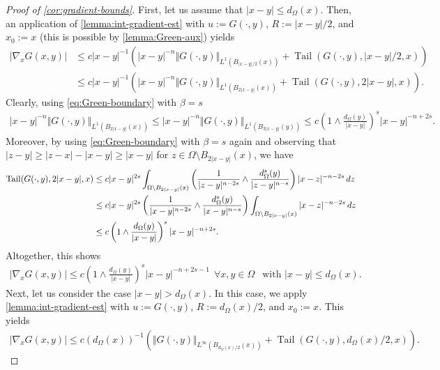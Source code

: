 \documentclass[11pt,reqno]{amsart}
\theoremstyle{plain}
\theoremstyle{definition}
\numberwithin{equation}{section}
\newcommand{\1}{\mathbbm{1}}
\DeclareMathOperator{\tail}{Tail}
\renewcommand{\d}{\textnormal{\,d}}
\begin{document}
\begin{proof}[Proof of \autoref{cor:gradient-bounds}]
First, let us assume that $|x-y| \le d_{\Omega}(x)$. Then, an application of \autoref{lemma:int-gradient-est} with $u := G(\cdot,y)$, $R := |x-y|/2$, and $x_0 := x$ (this is possible by \autoref{lemma:Green-aux}) yields
\begin{align*}
|\nabla_x G(x,y)|
&\le c |x-y|^{-1} \left( |x-y|^{-n} \Vert G(\cdot,y) \Vert_{L^{1}(B_{|x-y|/2}(x))} + \tail(G(\cdot,y),|x-y|/2, x) \right) \\
&\le c |x-y|^{-1} \left( |x-y|^{-n} \Vert G(\cdot,y) \Vert_{L^{1}(B_{2|x-y|}(x))} + \tail(G(\cdot,y),2|x-y|, x) \right).
\end{align*}
Clearly, using \eqref{eq:Green-boundary} with $\beta=s$
\begin{align*}
|x-y|^{-n} \Vert G(\cdot,y) \Vert_{L^{1}(B_{2|x-y|}(x))} \le |x-y|^{-n} \Vert G(\cdot,y) \Vert_{L^{1}(B_{3|x-y|}(y))} \le c \left( 1 \wedge \frac{d_{\Omega}(y)}{|x-y|} \right)^s |x-y|^{-n+2s}.
\end{align*}
Moreover, by using \eqref{eq:Green-boundary} with $\beta=s$ again and observing that $|z-y| \ge |z-x| - |x-y| \ge |x-y|$ for $z \in \Omega \setminus B_{2|x-y|}(x)$, we have
\begin{align*}
    \tail(G(\cdot,y),2|x-y|,x)
    &\le c |x-y|^{2s} \int_{\Omega \setminus B_{2|x-y|}(x)} \left( \frac{1}{|z-y|^{n-2s}} \wedge \frac{d_\Omega^s(y)}{|z-y|^{n-s}} \right) |x-z|^{-n-2s} \d z \\
    &\leq c |x-y|^{2s} \left( \frac{1}{|x-y|^{n-2s}} \wedge \frac{d_\Omega^s(y)}{|x-y|^{n-s}} \right) \int_{\Omega \setminus B_{2|x-y|}(x)} |x-z|^{-n-2s} \d z \\
    &\leq c\left( 1 \wedge \frac{d_\Omega(y)}{|x-y|} \right)^s |x-y|^{-n+2s}.
\end{align*}
Altogether, this shows
\begin{align*}
|\nabla_x G(x,y)| \le c \left( 1 \wedge \frac{d_{\Omega}(y)}{|x-y|} \right)^s |x-y|^{-n+2s-1} ~~ \forall x,y \in \Omega ~~ \text{ with } |x-y| \le d_{\Omega}(x).
\end{align*}
Next, let us consider the case $|x-y|>d_{\Omega}(x)$. In this case, we apply \autoref{lemma:int-gradient-est} with $u := G(\cdot,y)$, $R := d_{\Omega}(x)/2$, and $x_0 := x$. This yields
\begin{align*}
|\nabla_x G(x,y)| \le c (d_{\Omega}(x))^{-1} \left( \Vert G(\cdot,y) \Vert_{L^{\infty}(B_{d_{\Omega}(x)/2}(x))} + \tail(G(\cdot,y),d_{\Omega}(x)/2,x) \right).
\end{align*}

\end{proof}
\end{document}
